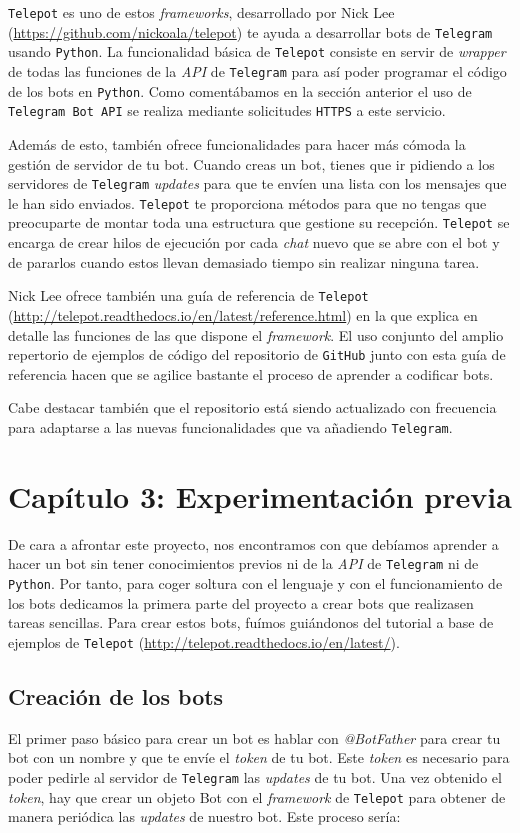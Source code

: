 \documentclass[oneside]{memoir}
\newcommand{\mychapter}[2]{
    \setcounter{chapter}{#1}
    \setcounter{section}{0}
    \chapter*{#2}
    \addcontentsline{toc}{chapter}{#2}
}
\begin{document}
\texttt{Telepot} es uno de estos \textit{frameworks}, desarrollado por Nick Lee (\url{https://github.com/nickoala/telepot}) te ayuda a desarrollar bots de \texttt{Telegram} usando \texttt{Python}. La funcionalidad básica de \texttt{Telepot} consiste en servir de \textit{wrapper} de todas las funciones de la \textit{API} de \texttt{Telegram} para así poder programar el código de los bots en \texttt{Python}. Como comentábamos en la sección anterior el uso de \texttt{Telegram Bot API} se realiza mediante solicitudes \texttt{HTTPS} a este servicio.

Además de esto, también ofrece funcionalidades para hacer más cómoda la gestión de servidor de tu bot. Cuando creas un bot, tienes que ir pidiendo a los servidores de \texttt{Telegram} \textit{updates} para que te envíen una lista con los mensajes que le han sido enviados. \texttt{Telepot} te proporciona métodos para que no tengas que preocuparte de montar toda una estructura que gestione su recepción. \texttt{Telepot} se encarga de crear hilos de ejecución por cada \textit{chat} nuevo que se abre con el bot y de pararlos cuando estos llevan demasiado tiempo sin realizar ninguna tarea.

Nick Lee ofrece también una guía de referencia de \texttt{Telepot} (\url{http://telepot.readthedocs.io/en/latest/reference.html}) en la que explica en detalle las funciones de las que dispone el \textit{framework}. El uso conjunto del amplio repertorio de ejemplos de código del repositorio de \texttt{GitHub} junto con esta guía de referencia hacen que se agilice bastante el proceso de aprender a codificar bots.

Cabe destacar también que el repositorio está siendo actualizado con frecuencia para adaptarse a las nuevas funcionalidades que va añadiendo \texttt{Telegram}.

\newpage
\mychapter{3}{Cap\'itulo 3: Experimentaci\'on previa}
De cara a afrontar este proyecto, nos encontramos con que debíamos aprender a hacer un bot sin tener conocimientos previos ni de la \textit{API} de \texttt{Telegram} ni de \texttt{Python}. Por tanto, para coger soltura con el lenguaje y con el funcionamiento de los bots dedicamos la primera parte del proyecto a crear bots que realizasen tareas sencillas. Para crear estos bots, fuímos guiándonos del tutorial a base de ejemplos de \texttt{Telepot} (\url{http://telepot.readthedocs.io/en/latest/}).

\section{Creación de los bots}
El primer paso básico para crear un bot es hablar con \textit{@BotFather} para crear tu bot con un nombre y que te envíe el \textit{token} de tu bot. Este \textit{token} es necesario para poder pedirle al servidor de \texttt{Telegram} las \textit{updates} de tu bot. Una vez obtenido el \textit{token}, hay que crear un objeto Bot con el \textit{framework} de \texttt{Telepot} para obtener de manera periódica las \textit{updates} de nuestro bot. Este proceso sería:
\end{document}
